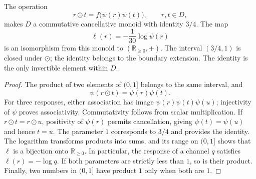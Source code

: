 \begin{proposition}
\label{cr28:comp-monoid}
The operation
\begin{equation}
 r\odot t=f\bigl(\psi(r)\psi(t)\bigr),\qquad r,t\in D,
 \label{cr28:comp-law}
\end{equation}
makes $D$ a commutative cancellative monoid with identity $3/4$.
The map
\begin{equation}
 \ell(r)=-\frac1{30}\log\psi(r)
 \label{cr28:comp-character}
\end{equation}
is an isomorphism from this monoid to $(\mathbb R_{\geq0},+)$.
The interval $(3/4,1)$ is closed under $\odot$; the identity belongs
to the boundary extension. The identity is the only invertible element
within $D$.
\end{proposition}
\begin{proof}
The product of two elements of $(0,1]$ belongs to the same interval, and
\[
 \psi(r\odot t)=\psi(r)\psi(t).
\]
For three responses, either association has image
$\psi(r)\psi(t)\psi(u)$; injectivity of $\psi$ proves associativity.
Commutativity follows from scalar multiplication. If
$r\odot t=r\odot u$, positivity of $\psi(r)$ permits cancellation,
giving $\psi(t)=\psi(u)$ and hence $t=u$. The parameter $1$ corresponds
to $3/4$ and provides the identity. The logarithm transforms products into
sums, and its range on $(0,1]$ shows that $\ell$ is a bijection onto
$\mathbb R_{\geq0}$. In particular, the response of a channel $q$
satisfies $\ell(r)=-\log q$. If both parameters are strictly less than
$1$, so is their product. Finally, two numbers in $(0,1]$ have product
$1$ only when both are $1$.
\end{proof}

